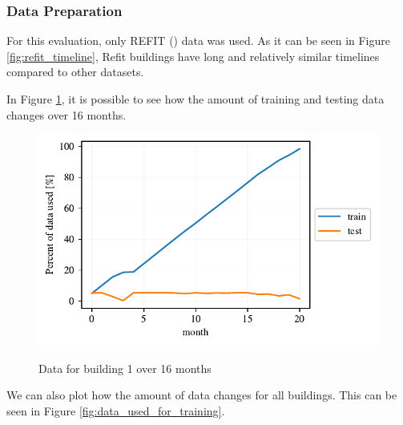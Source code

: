 \subsubsection{Data Preparation}
For this evaluation, only REFIT (\cite{REFIT}) data was used.
As it can be seen in Figure \ref{fig:refit_timeline},
Refit buildings have long and relatively similar timelines
compared to other datasets.

In Figure \ref{fig:dyn_data_1}, it is possible to see
how the amount of training and testing data changes over 16 months.

\begin{figure}[H]
	\centering
	\caption{Data for building 1 over 16 months}
	\includegraphics[]{Figures/EC/DYN/tst_tr_b1.pdf}
	\label{fig:dyn_data_1}
\end{figure}

We can also plot how the amount of data changes for all buildings.
This can be seen in Figure \ref{fig:data_used_for_training}.

